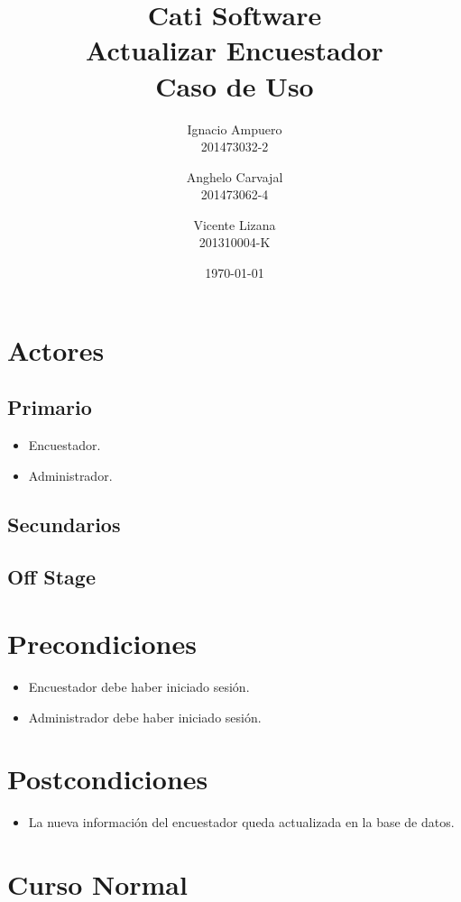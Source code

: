\documentclass[fleqn]{article}
\title{\huge Cati Software\\ \Huge Actualizar Encuestador\\ \Large Caso de Uso \vspace{30pt}}
\author{Ignacio Ampuero\\ 201473032-2 \and Anghelo Carvajal\\ 201473062-4 \and Vicente Lizana\\ 201310004-K}
\date{\today}
\begin{document}
\maketitle

\vspace{30pt}

\section{Actores}

	\subsection{Primario}

	\begin{itemize}
		\item Encuestador.
		\item Administrador.
	\end{itemize}

	\subsection{Secundarios}

	\subsection{Off Stage}

\section{Precondiciones}

\begin{itemize}
	\item Encuestador debe haber iniciado sesión.
	\item Administrador debe haber iniciado sesión.
\end{itemize}

\section{Postcondiciones}

\begin{itemize}
	\item La nueva información del encuestador queda actualizada en la base de datos.
\end{itemize}

\section{Curso Normal}
\end{document}
